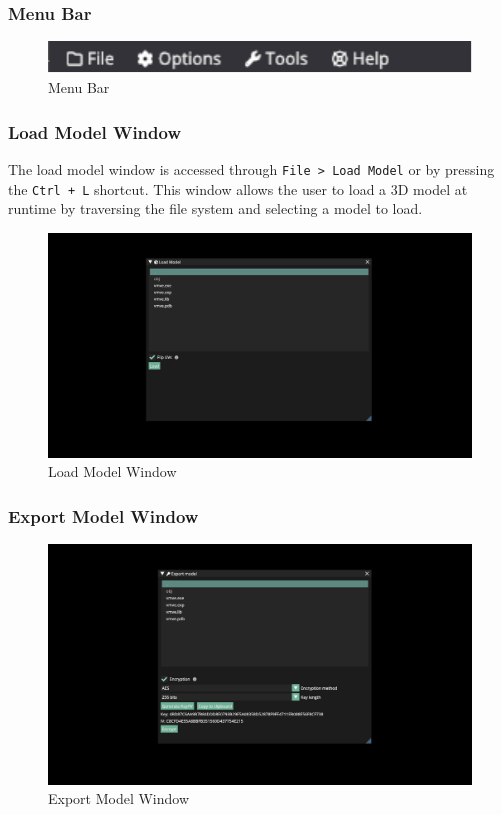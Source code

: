 \documentclass[11pt]{article}
\begin{document}
\subsubsection{Menu Bar}

\begin{figure}[h!]
  \centering
  \includegraphics[width=\textwidth]{images/menu_bar.png}
  \caption{Menu Bar}
  \label{fig:menu_bar}
\end{figure}


\subsubsection{Load Model Window}
The load model window is accessed through \lstinline{File > Load Model} or by
pressing the \lstinline{Ctrl + L} shortcut. This window allows the user to load
a 3D model at runtime by traversing the file system and selecting a model to
load.

\begin{figure}[h!]
  \centering
  \includegraphics[width=\textwidth]{images/load_model_window.png}
  \caption{Load Model Window}
  \label{fig:load_model_window}
\end{figure}


\subsubsection{Export Model Window}
\begin{figure}[h!]
  \centering
  \includegraphics[width=\textwidth]{images/encryption_system.png}
  \caption{Export Model Window}
  \label{fig:encryption_window}
\end{figure}
\end{document}
